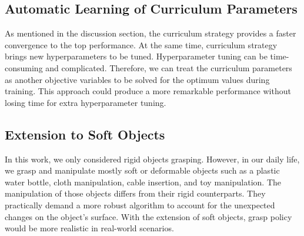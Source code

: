 \subsection{Automatic Learning of Curriculum Parameters}
 
As mentioned in the discussion section, the curriculum strategy provides a faster convergence to the top performance. At the same time, curriculum strategy brings new hyperparameters to be tuned. Hyperparameter tuning can be time-consuming and complicated. Therefore, we can treat the curriculum parameters as another objective variables to be solved for the optimum values during training. This approach could produce a more remarkable performance without losing time for extra hyperparameter tuning.
 
\subsection{Extension to Soft Objects}
 
In this work, we only considered rigid objects grasping. However, in our daily life, we grasp and manipulate mostly soft or deformable objects such as a plastic water bottle, cloth manipulation, cable insertion, and toy manipulation. The manipulation of those objects differs from their rigid counterparts. They practically demand a more robust algorithm to account for the unexpected changes on the object's surface. With the extension of soft objects, grasp policy would be more realistic in real-world scenarios.
